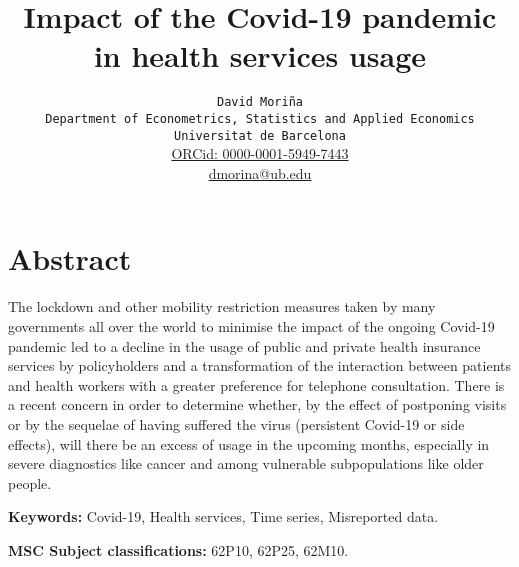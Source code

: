 \documentclass[main.tex]{subfiles}
\begin{document}
\author{ {\tt David Mori\~na}\\
{\tt Department of Econometrics, Statistics and Applied Economics}\\ {\tt Universitat de Barcelona}\\ \href{https://orcid.org/
0000-0001-5949-7443}{ORCid: 0000-0001-5949-7443}\\
\href{mailto:dmorina@ub.edu}{dmorina@ub.edu}
}


\title{Impact of the Covid-19 pandemic in health services usage}
\maketitle

\section*{Abstract}
The lockdown and other mobility restriction measures taken by many governments all over the world to minimise the impact of the ongoing Covid-19 pandemic led to a decline in the usage of public and private health insurance services by policyholders and a transformation of the interaction between patients and health workers with a greater preference for telephone consultation. There is a recent concern in order to determine whether, by the effect of postponing visits or by the sequelae of having suffered the virus (persistent Covid-19 or side effects), will there be an excess of usage in the upcoming months, especially in severe diagnostics like cancer and among vulnerable subpopulations like older people.
\medskip

\noindent\textbf{Keywords:} Covid-19, Health services, Time series, Misreported data.

\noindent\textbf{MSC Subject classifications:} 62P10, 62P25, 62M10.


\end{document}
